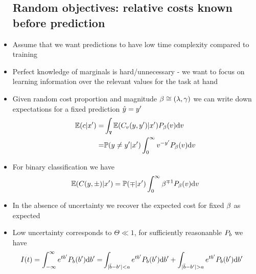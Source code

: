 \documentclass{article}
\begin{document}
\begin{itemize}
          \subsection{Random objectives: relative costs known before prediction}
        \item
          Assume that we want predictions to have low time complexity compared to training
        \item
          Perfect knowledge of marginals is hard/unnecessary - we want to focus on learning information over the relevant values for the task at hand
        \item
          Given random cost proportion and magnitude ${{\beta}}\cong({{\lambda}},{{\gamma}})$ we can write down expectations for a fixed prediction $\Pred=\TargD$
          \begin{align*}
            \EXPECTN(\Score|\FeatD)=&\int_{\RELCOSTS}\EXPECTN(\SCORE_\RELCOSTD(\Targ,\TargD)|\FeatD)\PMF_{\RELCOST}(\RELCOSTD)\dee\RELCOSTD\\
            =&\Prob(\Targ\neq\TargD|\FeatD)\int_0^{\infty}\RELCOSTD^{-\TargD}\PMF_{\RELCOST}(\RELCOSTD)\dee\RELCOSTD
          \end{align*}
        \item
          For binary classification we have
          $$
            \EXPECTN(\SCORE(y,\pm)|\FeatD)=\Prob(\mp|\FeatD)\int_0^{\infty}\RELCOST^{\mp1}\PMF_{\RELCOST}(\RELCOSTD)\dee \RELCOSTD\\
          $$
        \item
          In the absence of uncertainty we recover the expected cost for fixed ${{\beta}}$ as expected
        \item
          Low uncertainty corresponds to $\Theta\ll1$, for sufficiently reasonanble $\PMF_b$ we have
          \begin{align*}
            I(t)=\int_{-\infty}^\infty e^{tb'}\PMF_b(b')\dee b'=&\int_{|\bar b-b'|<a}e^{tb'}\PMF_b(b')\dee b'+\int_{|\bar b-b'|>a}e^{tb'}\PMF_b(b')\dee b'
          \end{align*}


\end{itemize}
\end{document}
